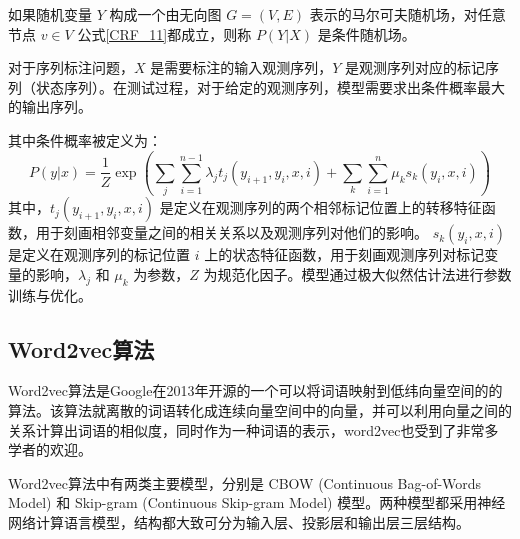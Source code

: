 如果随机变量 $Y$ 构成一个由无向图 $G=(V, E)$ 表示的马尔可夫随机场，对任意节点 $v \in V$ 公式\ref{CRF_11}都成立，则称 $P(Y|X)$ 是条件随机场。

对于序列标注问题，$X$ 是需要标注的输入观测序列，$Y$ 是观测序列对应的标记序列（状态序列）。在测试过程，对于给定的观测序列，模型需要求出条件概率最大的输出序列。

其中条件概率被定义为：
	\begin{equation}
P(y | x)=\frac{1}{Z} \exp \left(\sum_{j} \sum_{i=1}^{n-1} \lambda_{j} t_{j}\left(y_{i+1}, y_{i}, x, i\right)+\sum_{k} \sum_{i=1}^{n} \mu_{k} s_{k}\left(y_{i}, x, i\right)\right)
\end{equation}
其中，$t_j(y_{i+1}, y_i, x, i)$ 是定义在观测序列的两个相邻标记位置上的转移特征函数，用于刻画相邻变量之间的相关关系以及观测序列对他们的影响。 $s_k(y_i, x, i)$ 是定义在观测序列的标记位置 $i$ 上的状态特征函数，用于刻画观测序列对标记变量的影响，$\lambda_j$ 和 $\mu_k$ 为参数，$Z$ 为规范化因子。模型通过极大似然估计法进行参数训练与优化。

\subsection{Word2vec算法}
Word2vec算法是Google在2013年开源的一个可以将词语映射到低纬向量空间的的算法。该算法就离散的词语转化成连续向量空间中的向量，并可以利用向量之间的关系计算出词语的相似度，同时作为一种词语的表示，word2vec也受到了非常多学者的欢迎。

Word2vec算法中有两类主要模型，分别是 CBOW (Continuous Bag-of-Words Model) 和 Skip-gram (Continuous Skip-gram Model) 模型。两种模型都采用神经网络计算语言模型，结构都大致可分为输入层、投影层和输出层三层结构。

